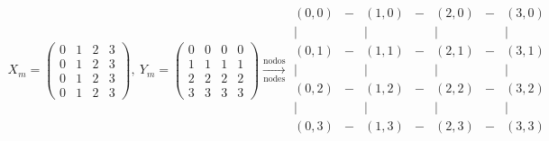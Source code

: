 \begin{align*}
X_m=\begin{pmatrix}
0&1&2&3\\
0&1&2&3\\
0&1&2&3\\
0&1&2&3
\end{pmatrix},\ Y_m=\begin{pmatrix}
0&0&0&0\\
1&1&1&1\\
2&2&2&2\\
3&3&3&3
\end{pmatrix}\xrightarrow[\text{nodes}]{\text{nodos}}\begin{matrix}
(0,0)&-&(1,0)&-&(2,0)&-&(3,0)\\
\vert&&\vert&&\vert&&\vert\\
(0,1)&-&(1,1)&-&(2,1)&-&(3,1)\\
\vert&&\vert&&\vert&&\vert\\
(0,2)&-&(1,2)&-&(2,2)&-&(3,2)\\
\vert&&\vert&&\vert&&\vert\\
(0,3)&-&(1,3)&-&(2,3)&-&(3,3)
\end{matrix}
\end{align*}

